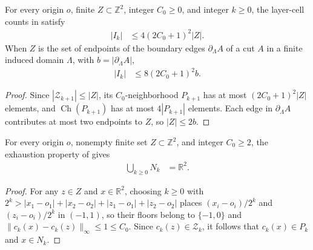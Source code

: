 \begin{lemma}
    \label{thm:area_law_dyadic_layer_count}
    \leanok
    For every origin $o$, finite $Z\subset\mathbb Z^2$, integer $C_0\ge0$,
    and integer $k\ge0$, the layer-cell counts in
    \cite[Section~11]{OpenAI2026AreaLaw} satisfy
    \begin{align}
        |I_k| & \le4(2C_0+1)^2|Z|.
    \end{align}
    When $Z$ is the set of endpoints of the boundary edges $\partial_\Lambda A$
    of a cut $A$ in a finite induced domain $\Lambda$, with $b=|\partial_\Lambda A|$,
    \begin{align}
        |I_k| & \le8(2C_0+1)^2b.
    \end{align}
\end{lemma}
\begin{proof}\leanok
    Since $|\mathcal Z_{k+1}|\le|Z|$, its $C_0$-neighborhood $P_{k+1}$ has at
    most $(2C_0+1)^2|Z|$ elements, and $\operatorname{Ch}(P_{k+1})$ has at most
    $4|P_{k+1}|$ elements. Each edge in $\partial_\Lambda A$ contributes at
    most two endpoints to $Z$, so $|Z|\le 2b$.
\end{proof}


\begin{lemma}
    \label{thm:area_law_dyadic_exhaustion}
    \leanok
    For every origin $o$, nonempty finite set $Z\subset\mathbb Z^2$, and
    integer $C_0\ge2$, the exhaustion property of
    \cite[Section~11]{OpenAI2026AreaLaw} gives
    \begin{align}
        \bigcup_{k\ge0}N_k & =\mathbb R^2.
    \end{align}
\end{lemma}
\begin{proof}\leanok
    For any $z\in Z$ and $x\in\mathbb R^2$, choosing $k\ge0$ with
    $2^k>|x_1-o_1|+|x_2-o_2|+|z_1-o_1|+|z_2-o_2|$ places
    $(x_i-o_i)/2^k$ and $(z_i-o_i)/2^k$ in $(-1,1)$, so their floors
    belong to $\{-1,0\}$ and $\|c_k(x)-c_k(z)\|_\infty\le1\le C_0$. Since
    $c_k(z)\in\mathcal Z_k$, it follows that $c_k(x)\in P_k$ and $x\in N_k$.
\end{proof}


